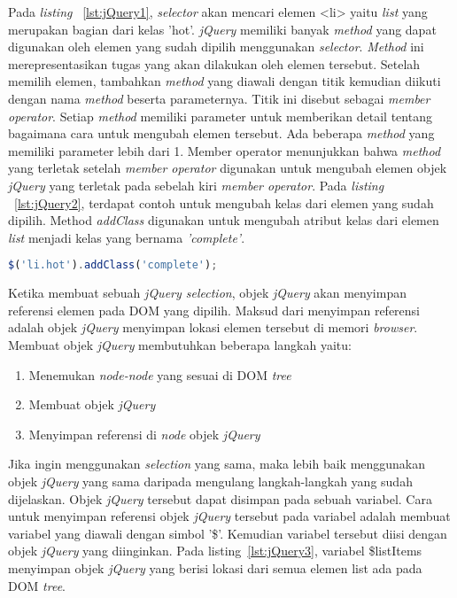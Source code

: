 Pada \textit{listing} ~\ref{lst:jQuery1}, \textit{selector} akan mencari elemen <li> yaitu \textit{list} yang merupakan bagian dari kelas 'hot'. \textit{jQuery} memiliki banyak \textit{method} yang dapat digunakan oleh elemen yang sudah dipilih menggunakan \textit{selector}. \textit{Method} ini merepresentasikan tugas yang akan dilakukan oleh elemen tersebut. Setelah memilih elemen, tambahkan \textit{method} yang diawali dengan titik kemudian diikuti dengan nama \textit{method} beserta parameternya. Titik ini disebut sebagai \textit{member operator}. Setiap \textit{method} memiliki parameter untuk memberikan detail tentang bagaimana cara untuk mengubah elemen tersebut. Ada beberapa \textit{method} yang memiliki parameter lebih dari 1.  Member operator menunjukkan bahwa \textit{method} yang terletak setelah \textit{member operator} digunakan untuk mengubah elemen objek \textit{jQuery} yang terletak pada sebelah kiri \textit{member operator}. Pada \textit{listing} ~\ref{lst:jQuery2}, terdapat contoh untuk mengubah kelas dari elemen yang sudah dipilih. Method \textit{addClass} digunakan untuk mengubah atribut kelas dari elemen \textit{list} menjadi kelas yang bernama \textit{'complete'}. 

\begin{lstlisting}[language=Javascript, caption=Mengubah kelas dari elemen yang sudah dipilih, label={lst:jQuery2}]
	$('li.hot').addClass('complete');
\end{lstlisting}

Ketika membuat sebuah \textit{jQuery selection}, objek \textit{jQuery} akan menyimpan referensi elemen pada DOM yang dipilih. Maksud dari menyimpan referensi adalah objek \textit{jQuery} menyimpan lokasi elemen tersebut di memori \textit{browser}. Membuat objek \textit{jQuery} membutuhkan beberapa langkah yaitu: 

\begin{enumerate}
	\item Menemukan \textit{node-node} yang sesuai di DOM \textit{tree}
	\item Membuat objek \textit{jQuery}
	\item Menyimpan referensi di \textit{node} objek \textit{jQuery}
\end{enumerate}

Jika ingin menggunakan \textit{selection} yang sama, maka lebih baik menggunakan objek \textit{jQuery} yang sama daripada mengulang langkah-langkah yang sudah dijelaskan. Objek \textit{jQuery} tersebut dapat disimpan pada sebuah variabel. Cara untuk menyimpan referensi objek \textit{jQuery} tersebut pada variabel adalah membuat variabel yang diawali dengan simbol '\$'. Kemudian variabel tersebut diisi dengan objek \textit{jQuery} yang diinginkan. Pada listing~\ref{lst:jQuery3}, variabel \$listItems menyimpan objek \textit{jQuery} yang berisi lokasi dari semua elemen list ada pada DOM \textit{tree}.

